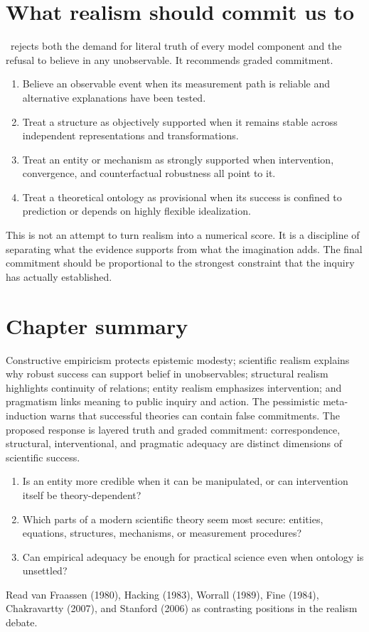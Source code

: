 \section{What realism should commit us to}

\RCR\ rejects both the demand for literal truth of every model component and
the refusal to believe in any unobservable. It recommends graded commitment.

\begin{enumerate}
\item Believe an observable event when its measurement path is reliable and
alternative explanations have been tested.
\item Treat a structure as objectively supported when it remains stable across
independent representations and transformations.
\item Treat an entity or mechanism as strongly supported when intervention,
convergence, and counterfactual robustness all point to it.
\item Treat a theoretical ontology as provisional when its success is confined
to prediction or depends on highly flexible idealization.
\end{enumerate}

This is not an attempt to turn realism into a numerical score. It is a
discipline of separating what the evidence supports from what the imagination
adds. The final commitment should be proportional to the strongest constraint
that the inquiry has actually established.

\section*{Chapter summary}

Constructive empiricism protects epistemic modesty; scientific realism explains
why robust success can support belief in unobservables; structural realism
highlights continuity of relations; entity realism emphasizes intervention; and
pragmatism links meaning to public inquiry and action. The pessimistic
meta-induction warns that successful theories can contain false commitments.
The proposed response is layered truth and graded commitment: correspondence,
structural, interventional, and pragmatic adequacy are distinct dimensions of
scientific success.

\begin{discussion}
\begin{enumerate}
\item Is an entity more credible when it can be manipulated, or can
intervention itself be theory-dependent?
\item Which parts of a modern scientific theory seem most secure: entities,
equations, structures, mechanisms, or measurement procedures?
\item Can empirical adequacy be enough for practical science even when
ontology is unsettled?
\end{enumerate}
\end{discussion}

\begin{furtherreading}
Read van Fraassen (1980), Hacking (1983), Worrall (1989), Fine (1984),
Chakravartty (2007), and Stanford (2006) as contrasting positions in the
realism debate.
\end{furtherreading}

